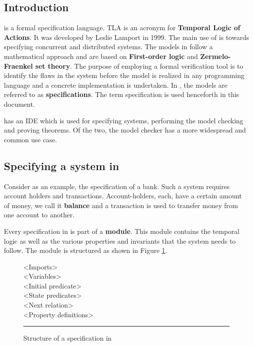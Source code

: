 \documentclass[fleqn]{tukseminar}
\begin{document}
			\subsection{Introduction}
			\tla is a formal specification language. TLA is an acronym for \textbf{Temporal Logic of Actions}\cite{DBLP:journals/toplas/Lamport94}. It was developed by Leslie Lamport in 1999. The main use of \tla is towards specifying concurrent and distributed systems. The models in \tla follow a mathematical approach and are based on \textbf{First-order logic }and \textbf{Zermelo-Fraenkel set theory}. The purpose of employing a formal verification tool is to identify the flaws in the system before the model is realized in any programming language and a concrete implementation is undertaken. In \tla, the models are referred to as \textbf{specifications}. The term specification is used henceforth in this document.
			
			\tla has an IDE which is used for specifying systems, performing the model checking and proving theorems. Of the two, the model checker has a more widespread and common use case. 
			
			\subsection{Specifying a system in \tla}
			
			Consider as an example, the specification of a bank. Such a system requires account holders and transactions. Account-holders, each, have a certain amount of money, we call it \textbf{balance} and a transaction is used to transfer money from one account to another. 
			
			Every specification in \tla is part of a \textbf{module}. This module contains the temporal logic as well as the various properties and invariants that the system needs to follow. 
			The module is structured as shown in Figure \ref{fig:modulestructure}.
			\begin{figure}[h]
				
				<Imports>\\
				<Variables>\\
				<Initial predicate>\\
				<State predicates>\\
				<Next relation>\\
				
				<Property definitions>\\
				
				\hrule
				
				\caption{Structure of a specification in \tla}
				\label{fig:modulestructure}
			\end{figure}
			
\end{document}

